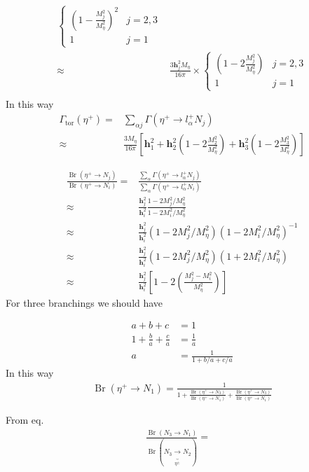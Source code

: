 \begin{subappendices}
\begin{align}
   \begin{cases}
     \displaystyle{\left(1-\frac{M_j^2}{M_\eta^2}\right)^2} & j=2,3\\
     1 & j=1
   \end{cases}\nonumber\\
   \approx&\frac{3\mathbf{h}_j^2M_\eta}{16\pi}\times
   \begin{cases}
     \displaystyle{\left(1-2\frac{M_j^2}{M_\eta^2}\right)} & j=2,3\\
     1 & j=1
   \end{cases}\nonumber\\
\end{align}
In this way
\begin{align}
  \Gamma_{\text{tor}}(\eta^+)=&\sum_{\alpha j}\Gamma(\eta^+\to l_\alpha^+ N_j)\nonumber\\
  \approx&\frac{3M_\eta}{16\pi}\left[\mathbf{h}_1^2
    +\mathbf{h}_2^2\left(1-2\frac{M_2^2}{M_\eta^2}\right)
    +\mathbf{h}_3^2\left(1-2\frac{M_3^2}{M_\eta^2}\right)\right]
\end{align}

\begin{align}
\frac{\operatorname{Br}(\eta^+\to N_j)}{\operatorname{Br}(\eta^+\to N_i)}=&  \frac{\sum_\alpha\Gamma(\eta^+\to l_\alpha^+ N_j)}{\sum_\alpha\Gamma(\eta^+\to l_\alpha^+ N_i)}\nonumber\\
\approx&\frac{\mathbf{h}_j^2}{\mathbf{h}_i^2}\frac{1-2M_j^2/M_\eta^2}{1-2M_i^2/M_\eta^2}\nonumber\\
 \approx&\frac{\mathbf{h}_j^2}{\mathbf{h}_i^2}(1-2M_j^2/M_\eta^2)(1-2M_i^2/M_\eta^2)^{-1}\nonumber\\
  \approx&\frac{\mathbf{h}_j^2}{\mathbf{h}_i^2}(1-2M_j^2/M_\eta^2)(1+2M_i^2/M_\eta^2)\nonumber\\
  \approx&\frac{\mathbf{h}_j^2}{\mathbf{h}_i^2}\left[1-2\left(\frac{M_j^2-M_i^2}{M_\eta^2}\right)\right]
\end{align}
For three branchings we should have

\begin{align}
  a+b+c&=1\nonumber\\
1+\frac{b}{a}+\frac{c}{a}&=\frac{1}{a}\nonumber\\
{a}&=\frac{1}{1+{b}/{a}+{c}/{a}}
\end{align}
In this way
\begin{align}
  {\operatorname{Br}(\eta^+\to N_1)}=\frac{1}{1+\frac{\operatorname{Br}(\eta^+\to N_3)}{\operatorname{Br}(\eta^+\to N_1)}+\frac{\operatorname{Br}(\eta^+\to N_3)}{\operatorname{Br}(\eta^+\to N_1)}}
\end{align}

From eq.%
\begin{align}
  \frac{\operatorname{Br}\left(N_3\to N_1\right)}
{\operatorname{Br}(N_3\underbrace{\to}_{\eta^\pm}N_2)}=&
\end{align}

\end{subappendices} %


